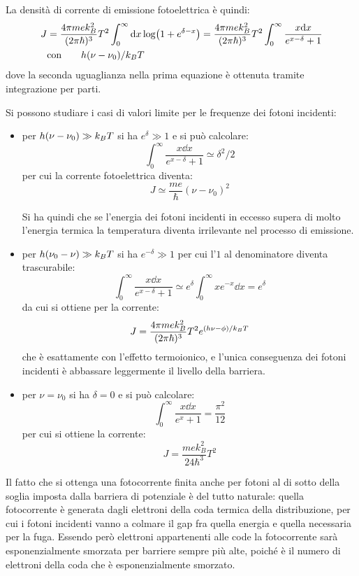 La densità di corrente di emissione fotoelettrica è quindi:
\begin{align*}
J &= \frac{4\pi m e k_B^2}{(2\pi \hbar)^3} T^2 \int_{0}^{\infty} \dd x \log( 1 + e^{\delta -x}) = \frac{4\pi m e k_B^2}{(2\pi \hbar)^3} T^2 \int_{0}^{\infty} \frac{x \dd x}{e^{x-\delta}+1} \\
&\text{con} \qquad h(\nu - \nu_0)/k_B T
\end{align*}
dove la seconda uguaglianza nella prima equazione è ottenuta tramite integrazione per parti.

Si possono studiare i casi di valori limite per le frequenze dei fotoni incidenti:
\begin{itemize}
	\item per $ h(\nu - \nu_0) \gg k_B T $ si ha $ e^\delta \gg 1 $ e si può calcolare:
		\[ \int_{0}^{\infty} \frac{x \dd x}{e^{x-\delta}+1} \simeq \delta^2/2 \]
		per cui la corrente fotoelettrica diventa:
		\[ J \simeq \frac{me}{\hbar} (\nu - \nu_0)^2\]
		
		Si ha quindi che se l'energia dei fotoni incidenti in eccesso supera di molto l'energia termica la temperatura diventa irrilevante nel processo di emissione.
	\item per $ h(\nu_0 - \nu) \gg k_B T $ si ha $ e^{-\delta} \gg 1 $ per cui l'$ 1 $ al denominatore diventa trascurabile:
		\[ \int_{0}^{\infty} \frac{x \dd x}{e^{x-\delta}+1} \simeq e^\delta \int_{0}^{\infty} x e^{-x} \dd x = e^\delta\]
		da cui si ottiene per la corrente:
		\[ J = \frac{4\pi m e k_B^2}{(2\pi \hbar)^3} T^2 e^{(h\nu - \phi)/k_B T}\]
		che è esattamente con l'effetto termoionico, e l'unica conseguenza dei fotoni incidenti è abbassare leggermente il livello della barriera.
	\item per $ \nu = \nu_0 $ si ha $ \delta = 0 $ e si può calcolare:
		\[ \int_{0}^{\infty} \frac{x \dd x}{e^{x}+1} = \frac{\pi^2}{12} \]
		per cui si ottiene la corrente:
		\[ J = \frac{m e k_B^2}{24 \hbar^3} T^2 \]
\end{itemize}

Il fatto che si ottenga una fotocorrente finita anche per fotoni al di sotto della soglia imposta dalla barriera di potenziale è del tutto naturale: quella fotocorrente è generata dagli elettroni della coda termica della distribuzione, per cui i fotoni incidenti vanno a colmare il gap fra quella energia e quella necessaria per la fuga.
Essendo però elettroni appartenenti alle code la fotocorrente sarà esponenzialmente smorzata per barriere sempre più alte, poiché è il numero di elettroni della coda che è esponenzialmente smorzato.

